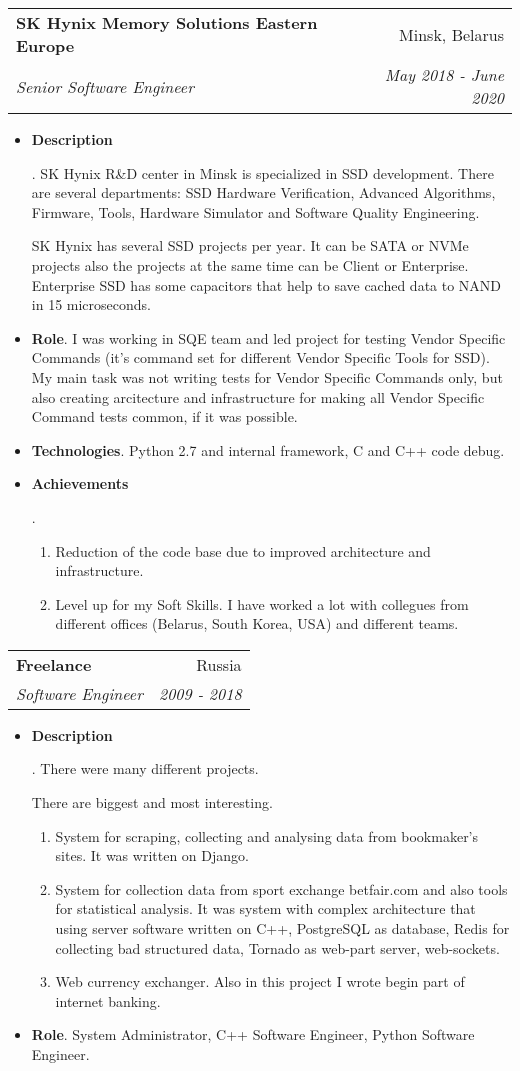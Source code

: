 \documentclass[letterpaper,11pt]{article}
\makeatletter
\newcommand{\resumeItem}[2]{
  \item\small{
    \textbf{#1}{. #2 \vspace{-2pt}}
  }
}
\newcommand{\resumeSubheading}[4]{
  \vspace{-1pt}\item
    \begin{tabular*}{0.97\textwidth}{l@{\extracolsep{\fill}}r}
      \textbf{#1} & #2 \\
      \textit{\small#3} & \textit{\small #4} \\
    \end{tabular*}\vspace{-5pt}
}
\newcommand{\resumeItemListStart}{\begin{itemize}}
\newcommand{\resumeItemListEnd}{\end{itemize}\vspace{-5pt}}
\makeatother
\begin{document}
    \resumeSubheading
      {SK Hynix Memory Solutions Eastern Europe}{Minsk, Belarus}
      {Senior Software Engineer}{May 2018 - June 2020}
      \resumeItemListStart
	\resumeItem{Description}
	 {SK Hynix R\&D center in Minsk is specialized in SSD development. There are several departments: SSD Hardware Verification, Advanced Algorithms, Firmware, Tools, Hardware Simulator and Software Quality Engineering.

	SK Hynix has several SSD projects per year. It can be SATA or NVMe projects also the projects at the same time can be Client or Enterprise. Enterprise SSD has some capacitors that help to save cached data to NAND in 15 microseconds.}
	\resumeItem{Role}
	{I was working in SQE team and led project for testing Vendor Specific Commands (it's command set for different Vendor Specific Tools for SSD). My main task was not writing tests for Vendor Specific Commands only, but also creating arcitecture and infrastructure for making all Vendor Specific Command tests common, if it was possible.}
        \resumeItem{Technologies}
          {Python 2.7 and internal framework, C and C++ code debug.}
	\resumeItem{Achievements}
          {
            \begin{enumerate}
              \item Reduction of the code base due to improved architecture and infrastructure.
	      \item Level up for my Soft Skills. I have worked a lot with collegues from different offices (Belarus, South Korea, USA) and different teams.
            \end{enumerate}
          }
      \resumeItemListEnd


    \resumeSubheading
      {Freelance}{Russia}
      {Software Engineer}{2009 - 2018}
      \resumeItemListStart
        \resumeItem{Description}
          {There were many different projects.

           There are biggest and most interesting.
	   \begin{enumerate}
             \item System for scraping, collecting and analysing data from bookmaker's sites. It was written on Django.
             \item System for collection data from sport exchange betfair.com and also tools for statistical analysis. It was system with complex architecture that using server software written on C++, PostgreSQL as database, Redis for collecting bad structured data, Tornado as web-part server, web-sockets.
             \item Web currency exchanger. Also in this project I wrote begin part of internet banking.
	   \end{enumerate}}
        \resumeItem{Role}
          {System Administrator, C++ Software Engineer, Python Software Engineer.}
      \resumeItemListEnd
\end{document}
